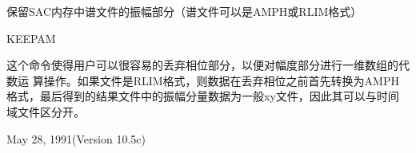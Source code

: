 \label{cmd:keepam}

保留SAC内存中谱文件的振幅部分（谱文件可以是AMPH或RLIM格式）

KEEPAM

这个命令使得用户可以很容易的丢弃相位部分，以便对幅度部分进行一维数组的代数运	算操作。如果文件是RLIM格式，则数据在丢弃相位之前首先转换为AMPH格式，最后得到的结果文件中的振幅分量数据为一般xy文件，因此其可以与时间域文件区分开。

May 28, 1991(Version 10.5c)
